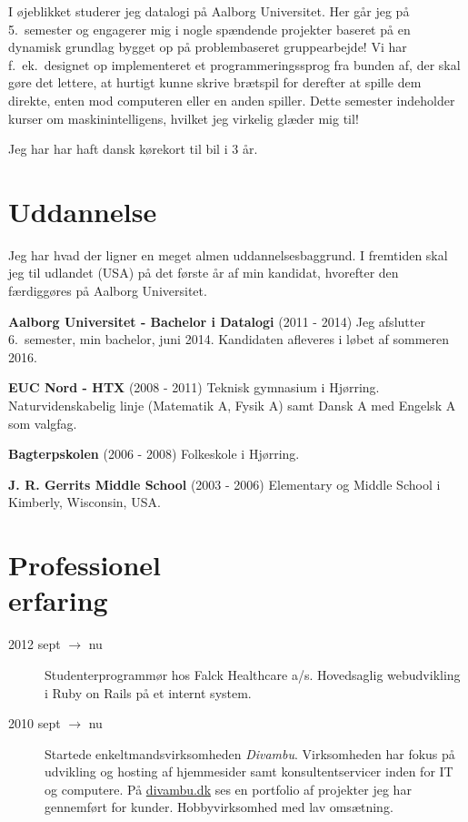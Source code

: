 \documentclass[margin,line,a4paper]{resume}
\begin{document}
\begin{resume}
    I øjeblikket studerer jeg datalogi på Aalborg Universitet. Her går
    jeg på 5.\ semester og engagerer mig i nogle spændende projekter
    baseret på en dynamisk grundlag bygget op på problembaseret
    gruppearbejde! Vi har f.\ ek.\ designet op implementeret et
    programmeringssprog fra bunden af, der skal gøre det lettere, at
    hurtigt kunne skrive brætspil for derefter at spille dem direkte,
    enten mod computeren eller en anden spiller. Dette semester
    indeholder kurser om maskinintelligens, hvilket jeg virkelig glæder
    mig til!

    Jeg har har haft dansk kørekort til bil i 3 år.

    \section{\mysidestyle Uddannelse}
    Jeg har hvad der ligner en meget almen uddannelsesbaggrund. I
    fremtiden skal jeg til udlandet (USA) på det første år af min
    kandidat, hvorefter den færdiggøres på Aalborg Universitet.

    \textbf{Aalborg Universitet - Bachelor i Datalogi}
      (2011 - 2014) Jeg afslutter 6.\ semester, min bachelor, juni
      2014. Kandidaten afleveres i løbet af sommeren 2016.

    \textbf{EUC Nord - HTX} (2008 - 2011) Teknisk gymnasium i Hjørring.
      Naturvidenskabelig linje (Matematik A, Fysik A) samt Dansk A med
      Engelsk A som valgfag.

    \textbf{Bagterpskolen} (2006 - 2008) Folkeskole i Hjørring.

    \textbf{J. R. Gerrits Middle School} (2003 - 2006) Elementary og
      Middle School i Kimberly, Wisconsin, USA.

\section{\mysidestyle Professionel\\erfaring}\vspace{1mm}
\begin{description}

  \item[2012 sept $\rightarrow$ nu] Studenterprogrammør hos Falck
    Healthcare a/s. Hovedsaglig webudvikling i Ruby on Rails på et internt
    system.

  \item[2010 sept $\rightarrow$ nu] Startede enkeltmandsvirksomheden
    \emph{Divambu}. Virksomheden har fokus på udvikling og hosting af
    hjemmesider samt konsultentservicer inden for IT og computere. På
    \url{divambu.dk} ses en portfolio af projekter jeg har gennemført for
    kunder. Hobbyvirksomhed med lav omsætning.


\end{description}
\end{resume}
\end{document}
